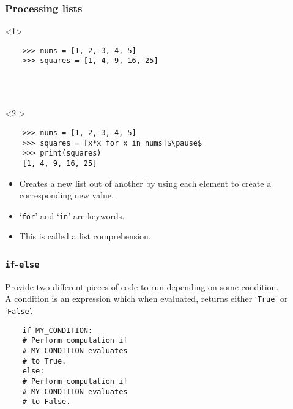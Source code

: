 \documentclass[notes]{beamer}
\begin{document}
\begin{frame}[fragile]
    \frametitle{Processing lists}
    
    \begin{onlyenv}<1>
    \begin{lstlisting}
    >>> nums = [1, 2, 3, 4, 5]
    >>> squares = [1, 4, 9, 16, 25]
    \end{lstlisting}
    
    ~ \\
    ~ \\

    \end{onlyenv}
    
    \pause
    
    \begin{onlyenv}<2->
    \begin{lstlisting}
    >>> nums = [1, 2, 3, 4, 5]
    >>> squares = [x*x for x in nums]$\pause$
    >>> print(squares)
    [1, 4, 9, 16, 25]
    \end{lstlisting}
    \end{onlyenv}
    
    \pause
    
    \begin{itemize}
        \item Creates a new list out of another by using each element to create a corresponding new value.
        \item `\lstinline|for|' and `\lstinline|in|' are keywords.
        \item This is called a \colorbox{jargonbg}{list comprehension}.
    \end{itemize}
\end{frame}


\begin{frame}[fragile]
    \frametitle{\lstinline|if|-\lstinline|else|}
    
    Provide two different pieces of code to run depending on some condition.\\
    \pause
    A condition is an expression which when evaluated, returns either `\lstinline|True|' or `\lstinline|False|'.
    
    \pause  
    \begin{lstlisting}
    if MY_CONDITION:
    # Perform computation if
    # MY_CONDITION evaluates
    # to True.
    else:
    # Perform computation if
    # MY_CONDITION evaluates
    # to False.
    \end{lstlisting}
\end{frame}
\end{document}
